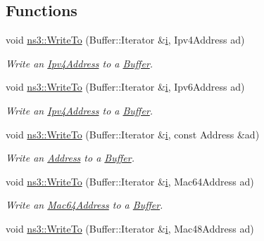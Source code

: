\subsection*{Functions}
\begin{DoxyCompactItemize}
\item 
void \hyperlink{namespacens3_abe3cb0173e87a3f7e2e414358c0a08bf}{ns3\+::\+Write\+To} (Buffer\+::\+Iterator \&\hyperlink{lte__uplink__power__control_8m_a6f6ccfcf58b31cb6412107d9d5281426}{i}, Ipv4\+Address ad)
\begin{DoxyCompactList}\small\item\em Write an \hyperlink{classns3_1_1Ipv4Address}{Ipv4\+Address} to a \hyperlink{classns3_1_1Buffer}{Buffer}. \end{DoxyCompactList}\item 
void \hyperlink{namespacens3_a8cb18ca2c56fad6c22d74594cb3b9d84}{ns3\+::\+Write\+To} (Buffer\+::\+Iterator \&\hyperlink{lte__uplink__power__control_8m_a6f6ccfcf58b31cb6412107d9d5281426}{i}, Ipv6\+Address ad)
\begin{DoxyCompactList}\small\item\em Write an \hyperlink{classns3_1_1Ipv4Address}{Ipv4\+Address} to a \hyperlink{classns3_1_1Buffer}{Buffer}. \end{DoxyCompactList}\item 
void \hyperlink{namespacens3_ab9c4ee718cab1f7e5248027d30b94c4d}{ns3\+::\+Write\+To} (Buffer\+::\+Iterator \&\hyperlink{lte__uplink__power__control_8m_a6f6ccfcf58b31cb6412107d9d5281426}{i}, const Address \&ad)
\begin{DoxyCompactList}\small\item\em Write an \hyperlink{classns3_1_1Address}{Address} to a \hyperlink{classns3_1_1Buffer}{Buffer}. \end{DoxyCompactList}\item 
void \hyperlink{namespacens3_ab92180aa127d2dcca1c8f92b39771335}{ns3\+::\+Write\+To} (Buffer\+::\+Iterator \&\hyperlink{lte__uplink__power__control_8m_a6f6ccfcf58b31cb6412107d9d5281426}{i}, Mac64\+Address ad)
\begin{DoxyCompactList}\small\item\em Write an \hyperlink{classns3_1_1Mac64Address}{Mac64\+Address} to a \hyperlink{classns3_1_1Buffer}{Buffer}. \end{DoxyCompactList}\item 
void \hyperlink{namespacens3_a5379d97874b31685fed8171d7a20d52c}{ns3\+::\+Write\+To} (Buffer\+::\+Iterator \&\hyperlink{lte__uplink__power__control_8m_a6f6ccfcf58b31cb6412107d9d5281426}{i}, Mac48\+Address ad)

\end{DoxyCompactItemize}
